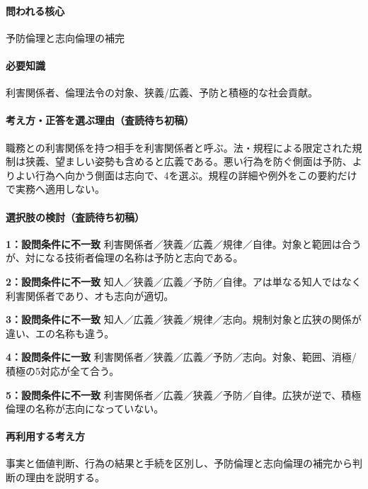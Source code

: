 \paragraph{問われる核心} 予防倫理と志向倫理の補完

\paragraph{必要知識} 利害関係者、倫理法令の対象、狭義/広義、予防と積極的な社会貢献。

\paragraph{考え方・正答を選ぶ理由（査読待ち初稿）} 職務との利害関係を持つ相手を利害関係者と呼ぶ。法・規程による限定された規制は狭義、望ましい姿勢も含めると広義である。悪い行為を防ぐ側面は予防、よりよい行為へ向かう側面は志向で、4を選ぶ。規程の詳細や例外をこの要約だけで実務へ適用しない。

\paragraph{選択肢の検討（査読待ち初稿）}\mbox{}\par

\noindent\textbf{1：設問条件に不一致} 利害関係者／狭義／広義／規律／自律。対象と範囲は合うが、対になる技術者倫理の名称は予防と志向である。\par

\noindent\textbf{2：設問条件に不一致} 知人／狭義／広義／予防／自律。アは単なる知人ではなく利害関係者であり、オも志向が適切。\par

\noindent\textbf{3：設問条件に不一致} 知人／広義／狭義／規律／志向。規制対象と広狭の関係が違い、エの名称も違う。\par

\noindent\textbf{4：設問条件に一致} 利害関係者／狭義／広義／予防／志向。対象、範囲、消極/積極の5対応が全て合う。\par

\noindent\textbf{5：設問条件に不一致} 利害関係者／広義／狭義／予防／自律。広狭が逆で、積極倫理の名称が志向になっていない。\par

\paragraph{再利用する考え方} 事実と価値判断、行為の結果と手続を区別し、予防倫理と志向倫理の補完から判断の理由を説明する。

